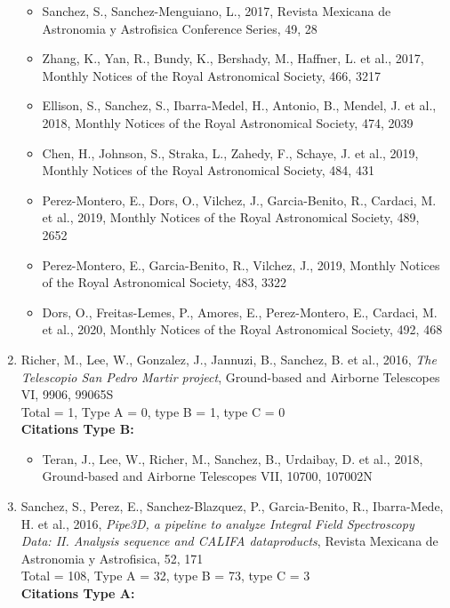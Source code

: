 \documentclass{letter}
\begin{document}
\begin{enumerate}
\begin{itemize}
\item Sanchez, S., Sanchez-Menguiano, L., 2017, Revista Mexicana de Astronomia y Astrofisica Conference Series, 49, 28
\item Zhang, K., Yan, R., Bundy, K., Bershady, M., Haffner, L. et al., 2017, Monthly Notices of the Royal Astronomical Society, 466, 3217
\item Ellison, S., Sanchez, S., Ibarra-Medel, H., Antonio, B., Mendel, J. et al., 2018, Monthly Notices of the Royal Astronomical Society, 474, 2039
\item Chen, H., Johnson, S., Straka, L., Zahedy, F., Schaye, J. et al., 2019, Monthly Notices of the Royal Astronomical Society, 484, 431
\item Perez-Montero, E., Dors, O., Vilchez, J., Garcia-Benito, R., Cardaci, M. et al., 2019, Monthly Notices of the Royal Astronomical Society, 489, 2652
\item Perez-Montero, E., Garcia-Benito, R., Vilchez, J., 2019, Monthly Notices of the Royal Astronomical Society, 483, 3322
\item Dors, O., Freitas-Lemes, P., Amores, E., Perez-Montero, E., Cardaci, M. et al., 2020, Monthly Notices of the Royal Astronomical Society, 492, 468
\end{itemize}
\item Richer, M., Lee, W., Gonzalez, J., Jannuzi, B., Sanchez, B. et al., 2016, {\it The Telescopio San Pedro Martir project}, Ground-based and Airborne Telescopes VI, 9906, 99065S \\ 
Total = 1, Type A = 0, type B = 1, type C = 0 \\ 
{\bf Citations Type B:}
\begin{itemize}
\item Teran, J., Lee, W., Richer, M., Sanchez, B., Urdaibay, D. et al., 2018, Ground-based and Airborne Telescopes VII, 10700, 107002N
\end{itemize}
\item Sanchez, S., Perez, E., Sanchez-Blazquez, P., Garcia-Benito, R., Ibarra-Mede, H. et al., 2016, {\it Pipe3D, a pipeline to analyze Integral Field Spectroscopy Data: II. Analysis sequence and CALIFA dataproducts}, Revista Mexicana de Astronomia y Astrofisica, 52, 171 \\ 
Total = 108, Type A = 32, type B = 73, type C = 3 \\ 
{\bf Citations Type A:}

\end{enumerate}
\end{document}

